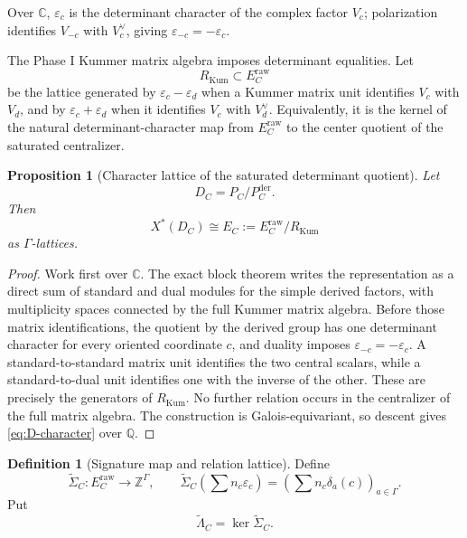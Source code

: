 \documentclass[11pt]{article}
\newtheorem{proposition}[theorem]{Proposition}
\theoremstyle{definition}
\newtheorem{definition}[theorem]{Definition}
\theoremstyle{remark}
\newcommand{\Q}{\mathbb Q}
\newcommand{\Z}{\mathbb Z}
\newcommand{\C}{\mathbb C}
\newcommand{\eps}{\varepsilon}
\newcommand{\raw}{\mathrm{raw}}
\newcommand{\der}{\mathrm{der}}
\begin{document}
Over $\C$, $\eps_c$ is the determinant character of the complex factor $V_c$; polarization identifies $V_{-c}$ with $V_c^\vee$, giving $\eps_{-c}=-\eps_c$.

The Phase I Kummer matrix algebra imposes determinant equalities.  Let
\[
 R_{\mathrm{Kum}}\subset E_C^{\raw}
\]
be the lattice generated by $\eps_c-\eps_d$ when a Kummer matrix unit identifies $V_c$ with $V_d$, and by $\eps_c+\eps_d$ when it identifies $V_c$ with $V_d^\vee$.  Equivalently, it is the kernel of the natural determinant-character map from $E_C^{\raw}$ to the center quotient of the saturated centralizer.

\begin{proposition}[Character lattice of the saturated determinant quotient]\label{prop:D-lattice}
Let
\[
 D_C=P_C/P_C^{\der}.
\]
Then
\begin{equation}\label{eq:D-character}
 X^*(D_C)\cong E_C:=E_C^{\raw}/R_{\mathrm{Kum}}
\end{equation}
as $\Gamma$-lattices.
\end{proposition}

\begin{proof}
Work first over $\C$.  The exact block theorem writes the representation as a direct sum of standard and dual modules for the simple derived factors, with multiplicity spaces connected by the full Kummer matrix algebra.  Before those matrix identifications, the quotient by the derived group has one determinant character for every oriented coordinate $c$, and duality imposes $\eps_{-c}=-\eps_c$.  A standard-to-standard matrix unit identifies the two central scalars, while a standard-to-dual unit identifies one with the inverse of the other.  These are precisely the generators of $R_{\mathrm{Kum}}$.  No further relation occurs in the centralizer of the full matrix algebra.  The construction is Galois-equivariant, so descent gives \eqref{eq:D-character} over $\Q$.
\end{proof}

\begin{definition}[Signature map and relation lattice]\label{def:signature-map}
Define
\begin{equation}\label{eq:Sigma-raw}
 \widetilde\Sigma_C:E_C^{\raw}\longrightarrow\Z^{\Gamma},
 \qquad
 \widetilde\Sigma_C\!\left(\sum n_c\eps_c\right)
 =\left(\sum n_c\delta_a(c)\right)_{a\in\Gamma}.
\end{equation}
Put
\begin{equation}\label{eq:Lambda-raw}
 \widetilde\Lambda_C=\ker\widetilde\Sigma_C.
\end{equation}
\end{definition}
\end{document}
